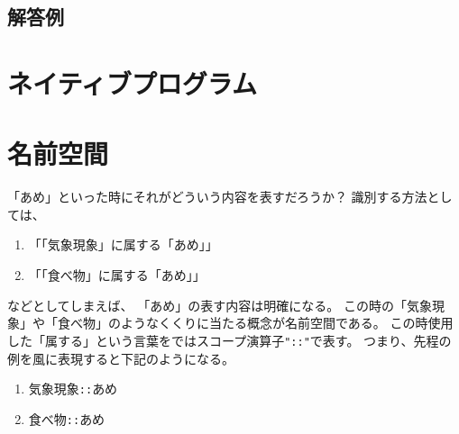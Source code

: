 \documentclass{jarticle}
\begin{document}
  \subsection{解答例}


 \section{ネイティブプログラム}


 \clearpage

 \appendix

 \section{名前空間\label{sec:namespace}}


 「あめ」といった時にそれがどういう内容を表すだろうか？
 識別する方法としては、
 \begin{enumerate}
  \item 「「気象現象」に属する「あめ」」
  \item「「食べ物」に属する「あめ」」
 \end{enumerate}
 などとしてしまえば、
 「あめ」の表す内容は明確になる。
 この時の「気象現象」や「食べ物」のようなくくりに当たる概念が名前空間である。
 この時使用した「属する」という言葉を\Cpp ではスコープ演算子\verb|"::"|で表す。
 つまり、先程の例を\Cpp 風に表現すると下記のようになる。
 \begin{enumerate}
  \item 気象現象\verb|::|あめ
  \item 食べ物\verb|::|あめ
 \end{enumerate}
\end{document}

